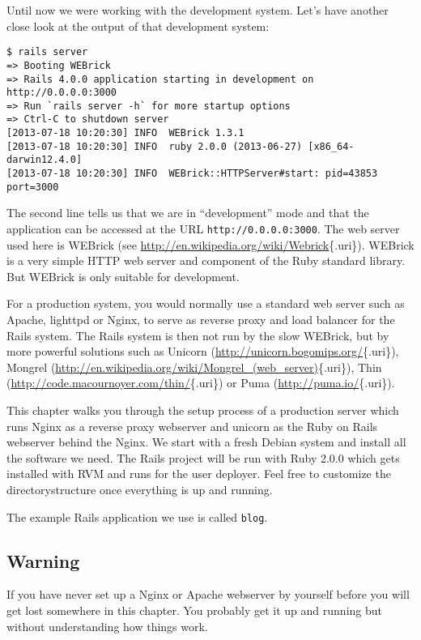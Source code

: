 \documentclass[a4paper]{book}
\newcounter{tab}[chapter]
\begin{document}
Until now we were working with the development system. Let's have another close look at the output of that development system:

\begin{shaded}\begin{verbatim}
$ rails server
=> Booting WEBrick
=> Rails 4.0.0 application starting in development on http://0.0.0.0:3000
=> Run `rails server -h` for more startup options
=> Ctrl-C to shutdown server
[2013-07-18 10:20:30] INFO  WEBrick 1.3.1
[2013-07-18 10:20:30] INFO  ruby 2.0.0 (2013-06-27) [x86_64-darwin12.4.0]
[2013-07-18 10:20:30] INFO  WEBrick::HTTPServer#start: pid=43853 port=3000
\end{verbatim}\end{shaded}

The second line tells us that we are in “development” mode and that the application can be accessed at the URL \texttt{http://0.0.0.0:3000}. The web server used here is WEBrick (see \url{http://en.wikipedia.org/wiki/Webrick}\{.uri\}). WEBrick is a very simple HTTP web server and component of the Ruby standard library. But WEBrick is only suitable for development.

For a production system, you would normally use a standard web server such as Apache, lighttpd or Nginx, to serve as reverse proxy and load balancer for the Rails system. The Rails system is then not run by the slow WEBrick, but by more powerful solutions such as Unicorn (\url{http://unicorn.bogomips.org/}\{.uri\}), Mongrel (\url{http://en.wikipedia.org/wiki/Mongrel_(web_server)}\{.uri\}), Thin (\url{http://code.macournoyer.com/thin/}\{.uri\}) or Puma (\url{http://puma.io/}\{.uri\}).

This chapter walks you through the setup process of a production server which runs Nginx as a reverse proxy webserver and unicorn as the Ruby on Rails webserver behind the Nginx. We start with a fresh Debian system and install all the software we need. The Rails project will be run with Ruby 2.0.0 which gets installed with RVM and runs for the user deployer. Feel free to customize the directorystructure once everything is up and running.

The example Rails application we use is called \texttt{blog}.

\subsection{Warning}\label{warning-16}

If you have never set up a Nginx or Apache webserver by yourself before you will get lost somewhere in this chapter. You probably get it up and running but without understanding how things work.
\end{document}
